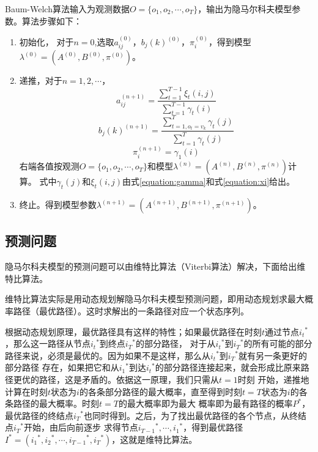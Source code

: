         Baum-Welch算法输入为观测数据$O = \{ {o_1},{o_2}, \cdots ,{o_T}\}$，输出为隐马尔科夫模型参数。算法步骤如下：
        \begin{enumerate}
            \item 初始化，
                对于$n=0$,选取$a_{ij}^{(0)}$，${b_j}{(k)^{(0)}}$，$\pi _i^{(0)}$，得到模型${\lambda ^{(0)}} = \left( {{A^{(0)}},{B^{(0)}},{\pi ^{(0)}}} \right)$。
            \item 递推，对于$n = 1,2, \cdots $，
                    \[a_{ij}^{(n + 1)} = \frac{{\sum\limits_{t = 1}^{T - 1} {{\xi _t}(i,j)} }}{{\sum\limits_{t = 1}^{T - 1} {{\gamma _t}(i)} }}\]
                    \[{b_j}{(k)^{(n + 1)}} = \frac{{\sum\limits_{t = 1,{o_t} = {v_k}}^T {{\gamma _t}(j)} }}{{\sum\limits_{t = 1}^T {{\gamma _t}(j)} }}\]
                    \[\pi _i^{(n + 1)} = {\gamma _1}(i)\]
                    右端各值按观测$O = \{ {o_1},{o_2}, \cdots ,{o_T}\}$和模型${\lambda ^{(n)}} = \left( {{A^{(n)}},{B^{(n)}},{\pi ^{(n)}}} \right)$计算。
                    式中${{\gamma _t}(j)}$和${{\xi _t}(i,j)}$由式\ref{equation:gamma}和式\ref{equation:xi}给出。
            \item 终止。得到模型参数${\lambda ^{(n + 1)}} = \left( {{A^{(n + 1)}},{B^{(n + 1)}},{\pi ^{(n + 1)}}} \right)$。
        \end{enumerate}

    \subsection{预测问题}\label{section:predict}
    隐马尔科夫模型的预测问题可以由维特比算法（Viterbi算法）解决，下面给出维特比算法。

    维特比算法实际是用动态规划解隐马尔科夫模型预测问题，即用动态规划求最大概率路径（最优路径）。这时求解出的一条路径对应一个状态序列。

    根据动态规划原理，最优路径具有这样的特性；如果最优路径在时刻$t$通过节点${i_t}^*$，那么这一路径从节点${i_t}^*$到终点${i_T}^*$的部分路径，
    对于从${i_t}^*$到${i_T}^*$的所有可能的部分路径来说，必须是最优的。因为如果不是这样，那么从${i_t}^*$到${i_T}^*$就有另一条更好的部分路径
    存在，如果把它和从${i_1}^*$到达${i_t}^*$的部分路径连接起来，就会形成比原来路径更优的路径，这是矛盾的。依据这一原理，我们只需从$t=1$时刻
    开始，递推地计算在时刻$t$状态为$i$的各条部分路径的最大概率，直至得到时刻$t=T$状态为$i$的各条路径的最大概率。时刻$t=T$的最大概率即为最大
    概率即为最有路径的概率${P^*}$，最优路径的终结点${i_T}^*$也同时得到。之后，为了找出最优路径的各个节点，从终结点${i_T}^*$开始，由后向前逐步
    求得节点${i_{T - 1}}^*, \cdots ,{i_1}^*$，得到最优路径${I^*} = ({i_1}^*,{i_2}^*, \cdots ,{i_{T - 1}}^*,{i_T}^*)$，这就是维特比算法。

